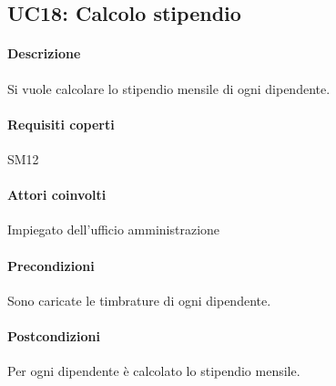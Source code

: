 \subsection{UC18: Calcolo stipendio}
\paragraph{Descrizione}
Si vuole calcolare lo stipendio mensile di ogni dipendente.
\paragraph{Requisiti coperti}
SM12
\paragraph{Attori coinvolti}
Impiegato dell'ufficio amministrazione
\paragraph{Precondizioni}
Sono caricate le timbrature di ogni dipendente.
\paragraph{Postcondizioni}
Per ogni dipendente è calcolato lo stipendio mensile.
